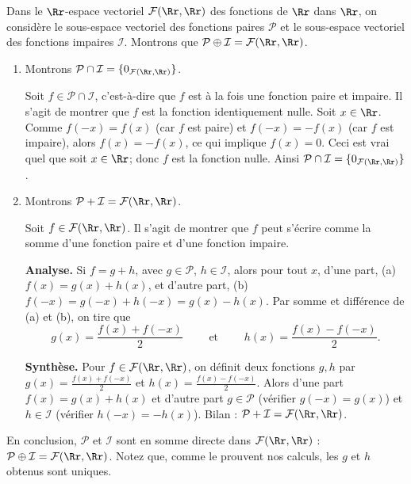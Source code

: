 \documentclass[class=report,crop=false]{standalone}
\begin{document}
\begin{exemple}
\label{ex:evsomme}
Dans le $\Rr$-espace vectoriel $\mathcal{F}(\Rr,\Rr)$
des fonctions de $\Rr$ dans $\Rr$, on considère le sous-espace
vectoriel des fonctions paires $\mathcal{P}$ et le sous-espace
vectoriel des fonctions impaires $\mathcal{I}$. Montrons que
$\mathcal{P}\oplus\mathcal{I}=\mathcal{F}(\Rr,\Rr)$.


\begin{enumerate}
  \item Montrons $\mathcal{P} \cap \mathcal{I} = \{ 0_{\mathcal{F}(\Rr,\Rr)} \}$.

  Soit $f \in \mathcal{P} \cap \mathcal{I}$, c'est-à-dire que $f$ est à la
  fois une fonction paire et impaire.
  Il s'agit de montrer que $f$ est la fonction identiquement nulle.
  Soit $x \in \Rr$. Comme $f(-x)=f(x)$ (car $f$ est paire) et $f(-x)=-f(x)$
  (car $f$ est impaire), alors $f(x)=-f(x)$, ce qui implique $f(x)=0$.
  Ceci est vrai quel que soit $x\in \Rr$; donc $f$ est la fonction nulle.
  Ainsi $\mathcal{P} \cap \mathcal{I} = \{ 0_{\mathcal{F}(\Rr,\Rr)} \}$.

  \item Montrons $\mathcal{P}+\mathcal{I}=\mathcal{F}(\Rr,\Rr)$.

  Soit $f \in \mathcal{F}(\Rr,\Rr)$. Il s'agit de montrer que $f$ peut s'écrire comme la somme
  d'une fonction paire et d'une fonction impaire.

  \textbf{Analyse.} Si $f = g+h$, avec $g\in\mathcal{P}$, $h\in\mathcal{I}$,
  alors pour tout $x$, d'une part, (a) $f(x)=g(x)+h(x)$, et
  d'autre part, (b) $f(-x)=g(-x)+h(-x)=g(x)-h(x)$.
  Par somme et différence de (a) et (b), on tire que
  $$g(x)=\frac{f(x)+f(-x)}2 \qquad \text{ et } \qquad h(x)=\frac{f(x)-f(-x)}2.$$

  \textbf{Synthèse.} Pour $f \in \mathcal{F}(\Rr,\Rr)$, on définit deux fonctions
  $g,h$ par $g(x)=\frac{f(x)+f(-x)}2$ et $h(x)=\frac{f(x)-f(-x)}2$. Alors d'une part
  $f(x)=g(x)+h(x)$ et d'autre part $g \in \mathcal{P}$ (vérifier $g(-x)=g(x)$)
  et $h\in\mathcal{I}$ (vérifier $h(-x)=-h(x)$).
  Bilan : $\mathcal{P}+\mathcal{I}=\mathcal{F}(\Rr,\Rr)$.

\end{enumerate}

En conclusion, $\mathcal{P}$ et $\mathcal{I}$ sont en somme directe dans $\mathcal{F}(\Rr , \Rr)$ :
$\mathcal{P}\oplus\mathcal{I}=\mathcal{F}(\Rr , \Rr)$.
Notez que, comme le prouvent nos calculs, les $g$ et $h$ obtenus sont uniques.
\end{exemple}
\end{document}
